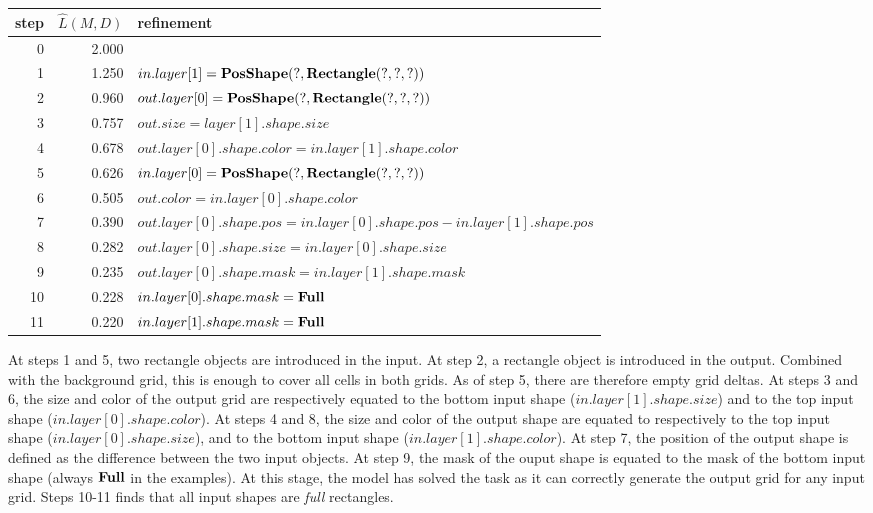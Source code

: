 \documentclass[a4paper]{llncs}
\begin{document}
\begin{center}
  \begin{tabular}{|r|r|l|}
    \hline
    step & $\hat{L}(M,D)$ & refinement \\
    \hline
    0 & 2.000 & \\
    1 & 1.250 & $in.layer[1] = {\bf PosShape}(?, {\bf Rectangle}(?,?,?))$ \\
    2 & 0.960 & $out.layer[0] = {\bf PosShape}(?, {\bf Rectangle}(?,?,?))$ \\
    3 & 0.757 & $out.size = layer[1].shape.size$ \\
    4 & 0.678 & $out.layer[0].shape.color = in.layer[1].shape.color$ \\
    5 & 0.626 & $in.layer[0] = {\bf PosShape}(?, {\bf Rectangle}(?,?,?))$ \\
    6 & 0.505 & $out.color = in.layer[0].shape.color$ \\
    7 & 0.390 & $out.layer[0].shape.pos = in.layer[0].shape.pos - in.layer[1].shape.pos$ \\    
    8 & 0.282 & $out.layer[0].shape.size = in.layer[0].shape.size$ \\
    9 & 0.235 & $out.layer[0].shape.mask = in.layer[1].shape.mask$ \\
    10 & 0.228 & $in.layer[0].shape.mask = {\bf Full}$ \\
    11 & 0.220 & $in.layer[1].shape.mask = {\bf Full}$ \\
    \hline
  \end{tabular}
\end{center}

At steps 1 and 5, two rectangle objects are introduced in the input.
At step 2, a rectangle object is introduced in the output. Combined
with the background grid, this is enough to cover all cells in both
grids. As of step 5, there are therefore empty grid deltas.
%
At steps 3 and 6, the size and color of the output grid are
respectively equated to the bottom input shape
($in.layer[1].shape.size$) and to the top input shape
($in.layer[0].shape.color$). At steps 4 and 8, the size and color of
the output shape are equated to respectively to the top input shape
($in.layer[0].shape.size$), and to the bottom input shape
($in.layer[1].shape.color$). At step 7, the position of the output
shape is defined as the difference between the two input objects.
At step 9, the mask of the ouput shape is
equated to the mask of the bottom input shape (always ${\bf Full}$ in the
examples).
%
At this stage, the model has solved the task as it can correctly
generate the output grid for any input grid.
%
Steps 10-11 finds that all input shapes are {\em full}
rectangles.
\end{document}
